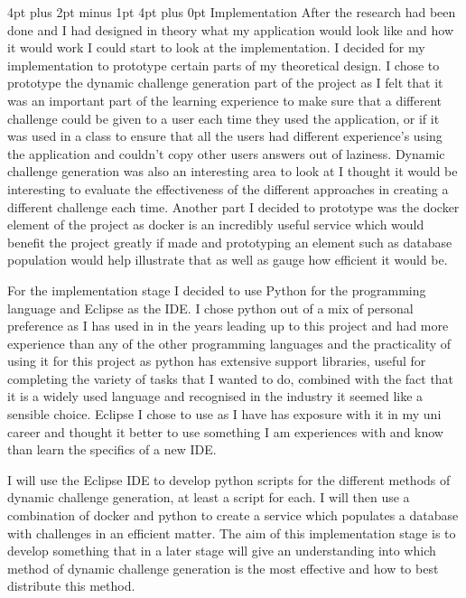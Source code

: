 \documentclass[12pt,a4paper]{article}
\makeatletter
\renewcommand\section{\@startsection {section}{1}{0mm} %
                               {4pt plus 2pt minus 1pt} %
                               {4pt plus 0pt} %
                               {\bfseries}}
\makeatother
\begin{document}

\section{Implementation}
After the research had been done and I had designed in theory what my application would look like and how it would work I could start to look at the implementation. I decided for my implementation to prototype certain parts of my theoretical design. I chose to prototype the dynamic challenge generation part of the project as I felt that it was an important part of the learning experience to make sure that a different challenge could be given to a user each time they used the application, or if it was used in a class to ensure that all the users had different experience's using the application and couldn't copy other users answers out of laziness. Dynamic challenge generation was also an interesting area to look at I thought it would be interesting to evaluate the effectiveness of the different approaches in creating a different challenge each time. Another part I decided to prototype was the docker element of the project as docker is an incredibly useful service which would benefit the project greatly if made and prototyping an element such as database population would help illustrate that as well as gauge how efficient it would be.  

For the implementation stage I decided to use Python for the programming language and Eclipse as the IDE. I chose python out of a mix of personal preference as I has used in in the years leading up to this project and had more experience than any of the other programming languages and the practicality of using it for this project as python has extensive support libraries, useful for completing the variety of tasks that I wanted to do, combined with the fact that it is a widely used language and recognised in the industry it seemed like a sensible choice. Eclipse I chose to use as I have has exposure with it in my uni career and thought it better to use something I am experiences with and know than learn the specifics of a new IDE.

I will use the Eclipse IDE to develop python scripts for the different methods of dynamic challenge generation, at least a script for each. I will then use a combination of docker and python to create a service which populates a database with challenges in an efficient matter. The aim of this implementation stage is to develop something that in a later stage will give an understanding into which method of dynamic challenge generation is the most effective and how to best distribute this method.   
\end{document}
